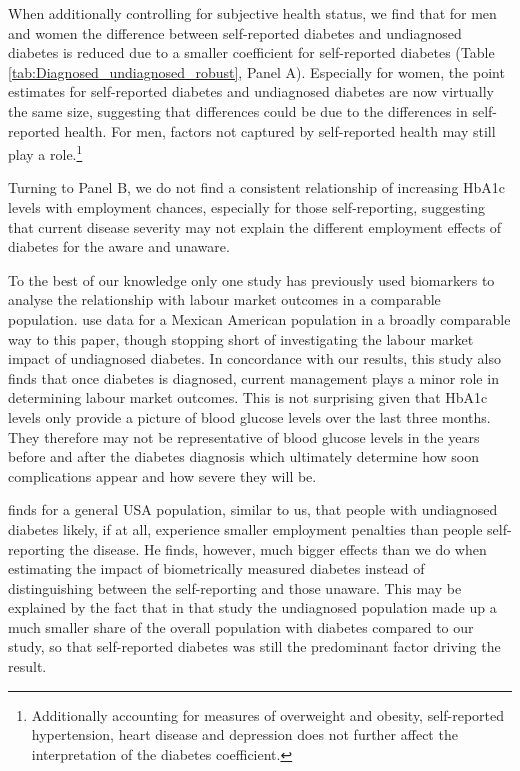 When additionally controlling for subjective health status, we find that for men and women the difference between self-reported diabetes and undiagnosed diabetes is reduced due to a smaller coefficient for self-reported diabetes (Table \ref{tab:Diagnosed_undiagnosed_robust}, Panel A). Especially for women, the point estimates for self-reported diabetes and undiagnosed diabetes are now virtually the same size, suggesting that differences could be due to the differences in self-reported health. For men, factors not captured by self-reported health may still play a role.\footnote{Additionally accounting for measures of overweight and obesity, self-reported hypertension, heart disease and depression does not further affect the interpretation of the diabetes coefficient.}

Turning to Panel B, we do not find a consistent relationship of increasing \ac{HbA1c} levels with employment chances, especially for those self-reporting, suggesting that current disease severity may not explain the different employment effects of diabetes for the aware and unaware.

To the best of our knowledge only one study has previously used biomarkers to analyse the relationship with labour market outcomes in a comparable population. \textcite{BrownIII2011} use data for a Mexican American population in a broadly comparable way to this paper, though stopping short of investigating the labour market impact of undiagnosed diabetes. In concordance with our results, this study also finds that once diabetes is diagnosed, current management plays a minor role in determining labour market outcomes. This is not surprising given that \ac{HbA1c} levels only provide a picture of blood glucose levels over the last three months. They therefore may not be representative of blood glucose levels in the years before and after the diabetes diagnosis which ultimately determine how soon complications appear and how severe they will be.

\textcite{Minor2015} finds for a general USA population, similar to us, that people with undiagnosed diabetes likely, if at all, experience smaller employment penalties than people self-reporting the disease. He finds, however, much bigger effects than we do when estimating the impact of biometrically measured diabetes instead of distinguishing between the self-reporting and those unaware. This may be explained by the fact that in that study the undiagnosed population made up a much smaller share of the overall population with diabetes compared to our study, so that self-reported diabetes was still the predominant factor driving the result.  


